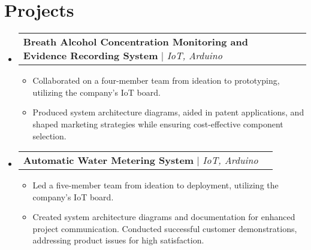\documentclass[letterpaper,11pt]{article}
\makeatletter
\newcommand{\resumeItem}[1]{
  \item\small{
    {#1 \vspace{-2pt}}
  }
}
\newcommand{\resumeSubheading}[4]{
  \vspace{-2pt}\item
    \begin{tabular*}{1.0\textwidth}[t]{l@{\extracolsep{\fill}}r}
      \textbf{#1} & \textbf{\small #2} \\
      \textit{\small#3} & \textit{\small #4} \\
    \end{tabular*}\vspace{-7pt}
}
\newcommand{\resumeProjectHeading}[2]{
    \item
    \begin{tabular*}{1.001\textwidth}{l@{\extracolsep{\fill}}r}
      \small#1 & \textbf{\small #2}\\
    \end{tabular*}\vspace{-7pt}
}
\newcommand{\resumeSubHeadingListStart}{\begin{itemize}[leftmargin=0.0in, label={}]}
\newcommand{\resumeSubHeadingListEnd}{\end{itemize}}
\newcommand{\resumeItemListStart}{\begin{itemize}}
\newcommand{\resumeItemListEnd}{\end{itemize}\vspace{-5pt}}
\makeatother
\begin{document}
\section{Projects}
\vspace{-5pt}
\resumeSubHeadingListStart
\resumeProjectHeading
{\textbf{Breath Alcohol Concentration Monitoring and Evidence Recording System} $|$ \emph{IoT, Arduino}}{}
\resumeItemListStart
\resumeItem{Collaborated on a four-member team from ideation to prototyping, utilizing the company's IoT board.}
\resumeItem{Produced system architecture diagrams, aided in patent applications, and shaped marketing strategies while ensuring cost-effective component selection.}
\resumeItemListEnd
\vspace{-13pt}
\resumeProjectHeading
{\textbf{Automatic Water Metering System} $|$ \emph{IoT, Arduino}}{}
\resumeItemListStart
\resumeItem{Led a five-member team from ideation to deployment, utilizing the company's IoT board.}
\resumeItem{Created system architecture diagrams and documentation for enhanced project communication. Conducted successful customer demonstrations, addressing product issues for high satisfaction.}
\resumeItemListEnd
\resumeSubHeadingListEnd
\vspace{-5pt}

%


\end{document}
